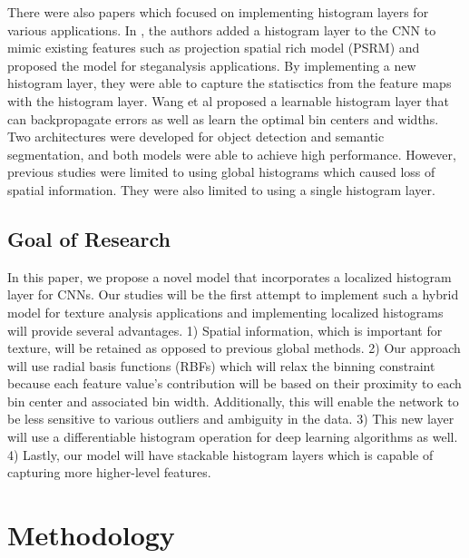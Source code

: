 \documentclass[10pt,twocolumn,letterpaper]{article}
\begin{document}
There were also papers which focused on implementing histogram layers for various applications. 
In \cite{Sedighi2017steg}, the authors added a histogram layer to the CNN to mimic existing features such as projection spatial rich model (PSRM) and proposed the model for steganalysis applications. By implementing a new histogram layer, they were able to capture the statisctics from the feature maps with the histogram layer. Wang et al \cite{Wang2018learnable} proposed a learnable histogram layer that can backpropagate errors as well as learn the optimal bin centers and widths. Two architectures were developed for object detection and semantic segmentation, and both models were able to achieve high performance.
However, previous studies were limited to using global histograms which caused loss of spatial information. They were also limited to using a single histogram layer.

\subsection{Goal of Research}

In this paper, we propose a novel model that incorporates a localized histogram layer for CNNs. Our studies will be the first attempt to implement such a hybrid model for texture analysis applications and implementing localized histograms will provide several advantages.
1) Spatial information, which is important for texture, will be retained as opposed to previous global methods. 2) Our approach will use radial basis functions (RBFs) which will relax the binning constraint because each feature value's contribution will be based on their proximity to each bin center and associated bin width. Additionally, this will enable the network to be less sensitive to various outliers and ambiguity in the data. 3) This new layer will use a differentiable histogram operation for deep learning algorithms as well. 4) Lastly, our model will have stackable histogram layers which is capable of capturing more higher-level features.
\\

\section{Methodology}
\end{document}

